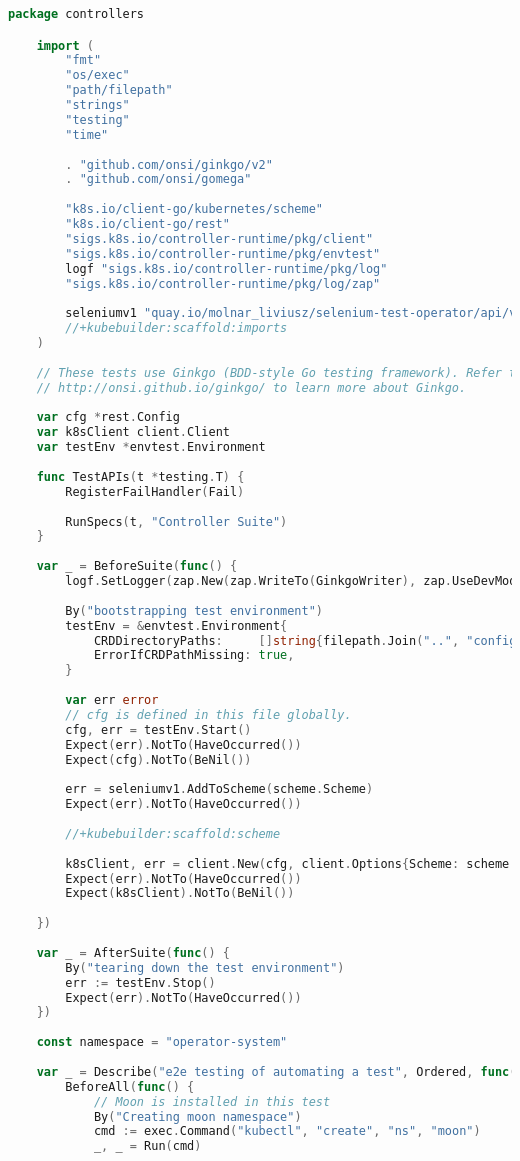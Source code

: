 \begin{lstlisting}[language={Go}]
	package controllers

	import (
		"fmt"
		"os/exec"
		"path/filepath"
		"strings"
		"testing"
		"time"
	
		. "github.com/onsi/ginkgo/v2"
		. "github.com/onsi/gomega"
	
		"k8s.io/client-go/kubernetes/scheme"
		"k8s.io/client-go/rest"
		"sigs.k8s.io/controller-runtime/pkg/client"
		"sigs.k8s.io/controller-runtime/pkg/envtest"
		logf "sigs.k8s.io/controller-runtime/pkg/log"
		"sigs.k8s.io/controller-runtime/pkg/log/zap"
	
		seleniumv1 "quay.io/molnar_liviusz/selenium-test-operator/api/v1"
		//+kubebuilder:scaffold:imports
	)
	
	// These tests use Ginkgo (BDD-style Go testing framework). Refer to
	// http://onsi.github.io/ginkgo/ to learn more about Ginkgo.
	
	var cfg *rest.Config
	var k8sClient client.Client
	var testEnv *envtest.Environment
	
	func TestAPIs(t *testing.T) {
		RegisterFailHandler(Fail)
	
		RunSpecs(t, "Controller Suite")
	}
	
	var _ = BeforeSuite(func() {
		logf.SetLogger(zap.New(zap.WriteTo(GinkgoWriter), zap.UseDevMode(true)))
	
		By("bootstrapping test environment")
		testEnv = &envtest.Environment{
			CRDDirectoryPaths:     []string{filepath.Join("..", "config", "crd", "bases")},
			ErrorIfCRDPathMissing: true,
		}
	
		var err error
		// cfg is defined in this file globally.
		cfg, err = testEnv.Start()
		Expect(err).NotTo(HaveOccurred())
		Expect(cfg).NotTo(BeNil())
	
		err = seleniumv1.AddToScheme(scheme.Scheme)
		Expect(err).NotTo(HaveOccurred())
	
		//+kubebuilder:scaffold:scheme
	
		k8sClient, err = client.New(cfg, client.Options{Scheme: scheme.Scheme})
		Expect(err).NotTo(HaveOccurred())
		Expect(k8sClient).NotTo(BeNil())
	
	})
	
	var _ = AfterSuite(func() {
		By("tearing down the test environment")
		err := testEnv.Stop()
		Expect(err).NotTo(HaveOccurred())
	})
	
	const namespace = "operator-system"
	
	var _ = Describe("e2e testing of automating a test", Ordered, func() {
		BeforeAll(func() {
			// Moon is installed in this test
			By("Creating moon namespace")
			cmd := exec.Command("kubectl", "create", "ns", "moon")
			_, _ = Run(cmd)
	

\end{lstlisting}
